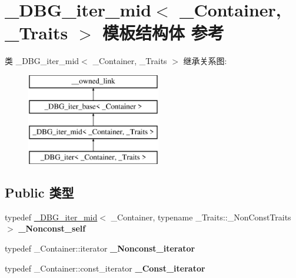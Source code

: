 \hypertarget{struct___d_b_g__iter__mid}{}\section{\+\_\+\+D\+B\+G\+\_\+iter\+\_\+mid$<$ \+\_\+\+Container, \+\_\+\+Traits $>$ 模板结构体 参考}
\label{struct___d_b_g__iter__mid}
类 \+\_\+\+D\+B\+G\+\_\+iter\+\_\+mid$<$ \+\_\+\+Container, \+\_\+\+Traits $>$ 继承关系图\+:\begin{figure}[H]
\begin{center}
\leavevmode
\includegraphics[height=4.000000cm]{struct___d_b_g__iter__mid}
\end{center}
\end{figure}
\subsection*{Public 类型}
\begin{DoxyCompactItemize}
\item 
\mbox{\label{struct___d_b_g__iter__mid_a723e8122646fa9297a5e6bb9fadd4cf0}} 
typedef \hyperlink{struct___d_b_g__iter__mid}{\+\_\+\+D\+B\+G\+\_\+iter\+\_\+mid}$<$ \+\_\+\+Container, typename \+\_\+\+Traits\+::\+\_\+\+Non\+Const\+Traits $>$ {\bfseries \+\_\+\+Nonconst\+\_\+self}
\item 
\mbox{\label{struct___d_b_g__iter__mid_a43ca84c843b0f08920cf470e5d9a1e00}} 
typedef \+\_\+\+Container\+::iterator {\bfseries \+\_\+\+Nonconst\+\_\+iterator}
\item 
\mbox{\label{struct___d_b_g__iter__mid_a2d56829d07d5a9218cc8db5a9aa2395a}} 
typedef \+\_\+\+Container\+::const\+\_\+iterator {\bfseries \+\_\+\+Const\+\_\+iterator}
\end{DoxyCompactItemize}
